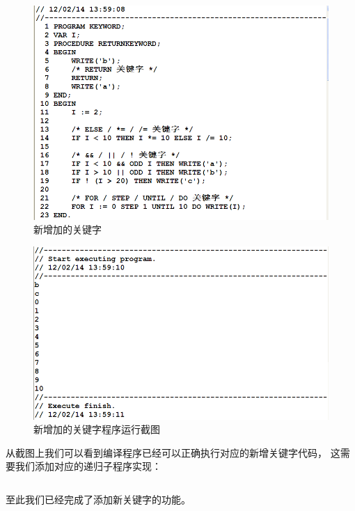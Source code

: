 \documentclass[]{guo}
\begin{document}
\begin{figure}[h!]
    \caption{新增加的关键字}
    \centering
        \includegraphics[scale=0.5]{figure/keywords.png}
\end{figure}

\clearpage

\begin{figure}[h!]
    \caption{新增加的关键字程序运行截图}
    \centering
        \includegraphics[scale=0.25]{figure/keywords-output.png}
\end{figure}

从截图上我们可以看到编译程序已经可以正确执行对应的新增关键字代码，
这需要我们添加对应的递归子程序实现：

\inputminted[baselinestretch=0.75,firstline=1277,lastline=1304,fontsize=\fontlm]{cpp}{Unit1.cpp}


至此我们已经完成了添加新关键字的功能。

\clearpage
\end{document}
